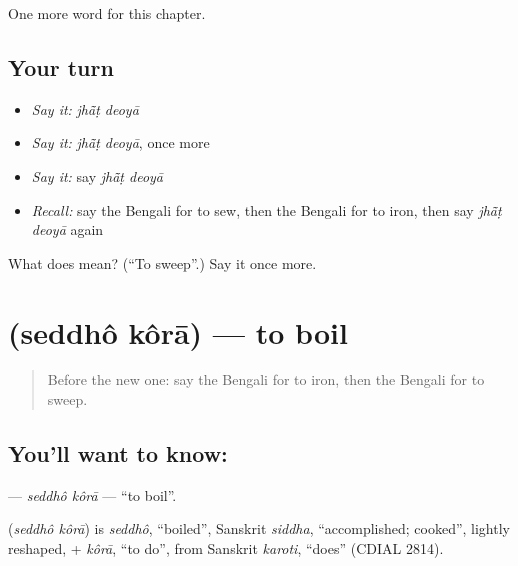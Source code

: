 \begin{grammarlens}[title={What you've built}]
One more word for this chapter.
\end{grammarlens}

\subsection*{Your turn}
\begin{itemize}
\raggedright
  \item \emph{Say it:} \emph{jhā̃ṭ deoyā}
  \item \emph{Say it:} \emph{jhā̃ṭ deoyā}, once more
  \item \emph{Say it:} say \emph{jhā̃ṭ deoyā}
  \item \emph{Recall:} say the Bengali for to sew, then the Bengali for to iron, then say \emph{jhā̃ṭ deoyā} again
\end{itemize}

\begin{tcolorbox}[breakable,colback=teal!4,colframe=teal!35!black,title={Before you move on}]
What does   mean? (\textquotedblleft{}To sweep\textquotedblright{}.) Say it once more.
\end{tcolorbox}
\section[\texorpdfstring{\bn{সেদ্ধ} \bn{করা} (seddhô kôrā)}{সেদ্ধ করা (seddhô kôrā)}]{  (seddhô kôrā) — to boil}

\label{lesson:BN-C148-seddho-kora}



\begin{quote}
Before the new one: say the Bengali for to iron, then the Bengali for to sweep.
\end{quote}

\subsection*{You'll want to know:  }
\textbf{ } — \emph{seddhô kôrā} — \textquotedblleft{}to boil\textquotedblright{}.

\begin{cousinweb}
\textbf{ } (\emph{seddhô kôrā}) is \emph{seddhô}, \textquotedblleft{}boiled\textquotedblright{}, Sanskrit \emph{siddha}, \textquotedblleft{}accomplished; cooked\textquotedblright{}, lightly reshaped, + \emph{kôrā}, \textquotedblleft{}to do\textquotedblright{}, from Sanskrit \emph{karoti}, \textquotedblleft{}does\textquotedblright{} (CDIAL 2814).
\end{cousinweb}


